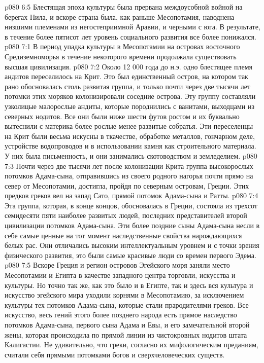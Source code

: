\vs p080 6:5 Блестящая эпоха культуры была прервана междоусобной войной на берегах Нила, и вскоре страна была, как раньше Месопотамия, наводнена низшими племенами из негостеприимной Аравии, и черными с юга. В результате, в течение более пятисот лет уровень социального развития все более понижался.
\vs p080 7:1 В период упадка культуры в Месопотамии на островах восточного Средиземноморья в течение некоторого времени продолжала существовать высшая цивилизация.
\vs p080 7:2 Около 12 000 года до н.э. одно блестящее племя андитов переселилось на Крит. Это был единственный остров, на котором так рано обосновалась столь развитая группа, и только почти через две тысячи лет потомки этих моряков колонизировали соседние острова. Эту группу составляли узколицые малорослые андиты, которые породнились с ванитами, выходцами из северных нодитов. Все они были ниже шести футов ростом и их буквально вытеснили с материка более рослые менее развитые собратья. Эти переселенцы на Крит были весьма искусны в ткачестве, обработке металлов, гончарном деле, устройстве водопроводов и в использовании камня как строительного материала. У них была письменность, и они занимались скотоводством и земледелием.
\vs p080 7:3 Почти через две тысячи лет после колонизации Крита группа высокорослых потомков Адама\hyp{}сына, отправившись из своего родного нагорья почти прямо на север от Месопотамии, достигла, пройдя по северным островам, Греции. Этих предков греков вел на запад Сато, прямой потомок Адама\hyp{}сына и Ратты.
\vs p080 7:4 Эта группа, которая, в конце концов, обосновалась в Греции, состояла из трехсот семидесяти пяти наиболее развитых людей, последних представителей второй цивилизации потомков Адама\hyp{}сына. Эти более поздние сыны Адама\hyp{}сына несли в себе самые ценные на тот момент наследственные свойства нарождающихся белых рас. Они отличались высоким интеллектуальным уровнем и с точки зрения физического развития, это были самые красивые люди со времен первого Эдема.
\vs p080 7:5 \pc Вскоре Греция и регион островов Эгейского моря заняли место Месопотамии и Египта в качестве западного центра торговли, искусства и культуры. Но точно так же, как это было и в Египте, так и здесь вся культура и искусство эгейского мира уходили корнями в Месопотамию, за исключением культуры тех потомков Адама\hyp{}сына, которые стали прародителями греков. Все искусство, весь гений этого более позднего народа есть прямое наследство потомков Адама\hyp{}сына, первого сына Адама и Евы, и его замечательной второй жены, которая происходила по прямой линии из чистокровных нодитов штата Калигастии. Не удивительно, что греки, согласно их мифологическим преданиям, считали себя прямыми потомками богов и сверхчеловеческих существ.
